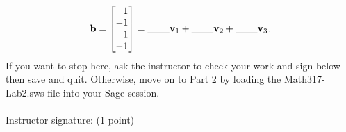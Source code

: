 \documentclass[fleqn,11pt]{paper}
\theoremstyle{remark}
\renewcommand{\vec}[1]{\mathbf{#1}}
\newcommand{\<}{\ensuremath{\langle}}
\renewcommand{\>}{\ensuremath{\rangle}}
\newcommand\vb{\vec{b}}
\newcommand\vv{\vec{v}}
\begin{document}
\vskip5mm
\[
  \vb = \begin{bmatrix*}[r] 1 \\ -1 \\ 1 \\ -1\end{bmatrix*}= \text{\underline{\phantom{XXX}}}\vv_1 + \text{\underline{\phantom{XXX}}} \vv_2+
\text{\underline{\phantom{XXX}}} \vv_3.
\]
\vskip5mm
\noindent  If you want to stop here, ask the instructor to check your work and sign below
then save and quit. Otherwise, move on to Part 2 by loading the Math317-Lab2.sws file into your 
Sage session.
    \\\\
    Instructor signature: \underline{\phantom{XXXXXXXXXXXXXXXXXXXXXXXXXXXXXXXX}} (1 point)
\end{document}
